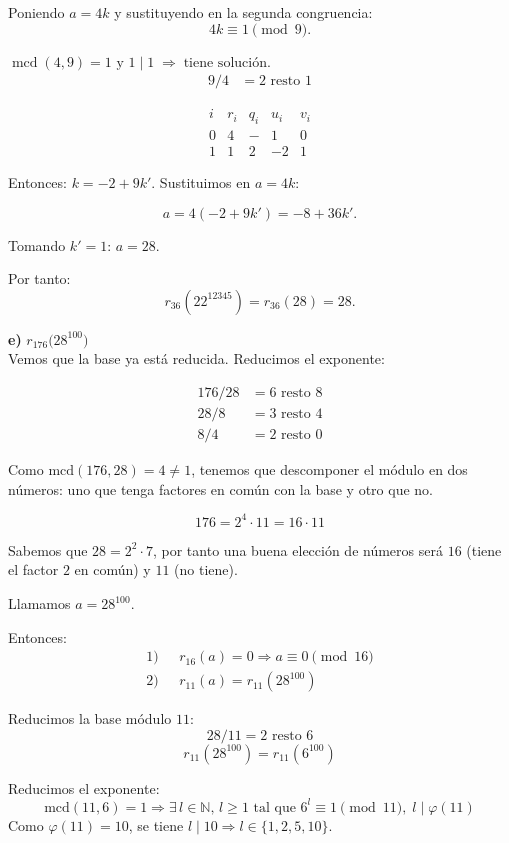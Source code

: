 \documentclass[a4paper,12pt]{article}
\begin{document}
\begin{ejercicio}[title=Ejercicio 28]

Poniendo \(a=4k\) y sustituyendo en la segunda congruencia:
\[
4k \equiv 1 \pmod{9}.
\]

$\operatorname{mcd}(4,9) = 1 \text{ y } 1 \mid 1 \;\Rightarrow\; \text{tiene solución.}$
\[
\begin{aligned}
    9 / 4 &= 2 \text{ resto } \boxed{1}
\end{aligned}
\]

\[
\begin{array}{c|c|c|c|c}
i & r_i & q_i & u_i & v_i \\ \hline
0 & 4 & - & 1 & 0 \\
1 & \boxed{1} & 2 & -2 & 1
\end{array}
\]

Entonces: \(k = -2 + 9k'\).  
Sustituimos en \(a = 4k\):

\[
a = 4(-2 + 9k') = -8 + 36k'.
\]

Tomando \(k' = 1\):  
\(a = 28.\)

Por tanto:
\[
r_{36}(22^{12345}) = r_{36}(28) = \boxed{28}.
\]

\textbf{e)} $r_{176}\bigl(28^{100}\bigr)$ \\

Vemos que la base ya está reducida.  
Reducimos el exponente:

\[
\begin{aligned}
176 / 28 &= 6 \text{ resto } 8 \\
28 / 8 &= 3 \text{ resto } \boxed{4} \\
8 / 4 &= 2 \text{ resto } 0
\end{aligned}
\]

Como $\mathrm{mcd}(176,28) = 4 \neq 1$, tenemos que descomponer el módulo en dos números:  
uno que tenga factores en común con la base y otro que no.

\[
176 = 2^4 \cdot 11 = 16 \cdot 11
\]

Sabemos que $28 = 2^2 \cdot 7$, por tanto una buena elección de números será  
$16$ (tiene el factor $2$ en común) y $11$ (no tiene).

Llamamos $a = 28^{100}$.

Entonces:
\[
\begin{aligned}
1) & \text{ }r_{16}(a) = 0 \Rightarrow a \equiv 0 \pmod{16} \\
2) & \text{ }r_{11}(a) = r_{11}(28^{100})    
\end{aligned}
\]

Reducimos la base módulo $11$:
\[
28 / 11 = 2 \text{ resto } 6
\]
\[
r_{11}(28^{100}) = r_{11}(6^{100})
\]

Reducimos el exponente:
\[
\mathrm{mcd}(11,6) = 1 \Rightarrow \exists\, l \in \mathbb{N},\, l \ge 1 \text{ tal que } 6^l \equiv 1 \pmod{11},\; l \mid \varphi(11)
\]
Como $\varphi(11) = 10$, se tiene $l \mid 10 \Rightarrow l \in \{1,2,5,10\}$.

\end{ejercicio}
\end{document}
